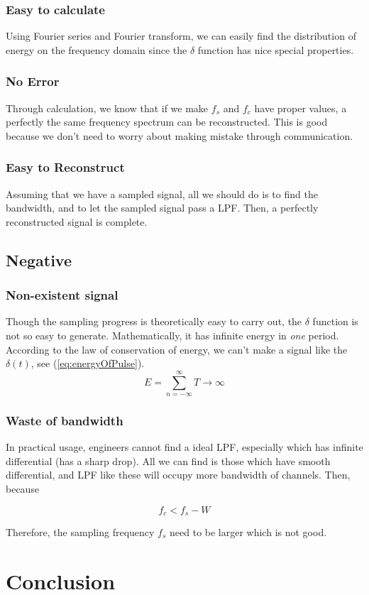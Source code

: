 \documentclass{article}
\begin{document}
\subsubsection*{Easy to calculate}
Using Fourier series and Fourier transform, we can easily find the distribution of energy on the frequency domain since the $\delta$ function has nice special properties.

\subsubsection*{No Error}
Through calculation, we know that if we make $f_s$ and $f_c$ have proper values, a perfectly the same frequency spectrum can be reconstructed. This is good because we don't need to worry about making mistake through communication.

\subsubsection*{Easy to Reconstruct}
Assuming that we have a sampled signal, all we should do is to find the bandwidth, and to let the sampled signal pass a LPF. Then, a perfectly reconstructed signal is complete.

\subsection{Negative}
\subsubsection*{Non-existent signal}
Though the sampling progress is theoretically easy to carry out, the $\delta$ function is not so easy to generate. Mathematically, it has infinite energy in \emph{one} period. According to the law of conservation of energy, we can't make a signal like the $\delta(t)$, see (\ref{eq:energyOfPulse}).
\begin{equation}
E = \sum_{n = -\infty}^{\infty} T \to \infty
\label{eq:energyOfPulse}
\end{equation}

\subsubsection*{Waste of bandwidth}
In practical usage, engineers cannot find a ideal LPF, especially which has infinite differential (has a sharp drop). All we can find is those which have smooth differential, and LPF like these will occupy more bandwidth of channels. Then, because

$$
f_c < f_s - W
$$

Therefore, the sampling frequency $f_s$ need to be larger which is not good.



\section{Conclusion}






\begin{appendices}

\end{appendices}
\end{document}
